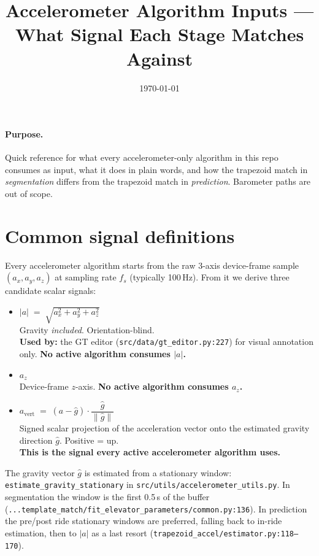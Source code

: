 \documentclass[11pt,a4paper]{article}
\title{Accelerometer Algorithm Inputs --- What Signal Each Stage Matches Against}
\author{}
\date{\today}
\newcommand{\avert}{a_{\mathrm{vert}}}
\newcommand{\amag}{\lvert a\rvert}
\begin{document}
\maketitle

\paragraph{Purpose.}
Quick reference for what every accelerometer-only algorithm in this
repo consumes as input, what it does in plain words, and how the
trapezoid match in \emph{segmentation} differs from the trapezoid
match in \emph{prediction}. Barometer paths are out of scope.

\section{Common signal definitions}

Every accelerometer algorithm starts from the raw 3-axis device-frame
sample $(a_x, a_y, a_z)$ at sampling rate $f_s$ (typically 100\,Hz).
From it we derive three candidate scalar signals:

\begin{itemize}\setlength\itemsep{2pt}
  \item $\amag \;=\; \sqrt{a_x^2 + a_y^2 + a_z^2}$ \\
        Gravity \emph{included}. Orientation-blind.\\
        \textbf{Used by:} the GT editor (\texttt{src/data/gt\_editor.py:227}) for visual annotation only. \textbf{No active algorithm consumes $\amag$.}
  \item $a_z$ \\
        Device-frame $z$-axis. \textbf{No active algorithm consumes $a_z$.}
  \item $\avert \;=\; (a - \hat g) \cdot \dfrac{\hat g}{\lVert \hat g\rVert}$ \\
        Signed scalar projection of the acceleration vector onto the
        estimated gravity direction $\hat g$. Positive = up. \\
        \textbf{This is the signal every active accelerometer algorithm
        uses.}
\end{itemize}

The gravity vector $\hat g$ is estimated from a stationary window:
\texttt{estimate\_gravity\_stationary} in
\texttt{src/utils/accelerometer\_utils.py}. In segmentation the
window is the first 0.5\,s of the buffer
(\texttt{...template\_match/fit\_elevator\_parameters/common.py:136}).
In prediction the pre/post ride stationary windows are preferred,
falling back to in-ride estimation, then to $\amag$ as a last resort
(\texttt{trapezoid\_accel/estimator.py:118--170}).
\end{document}
